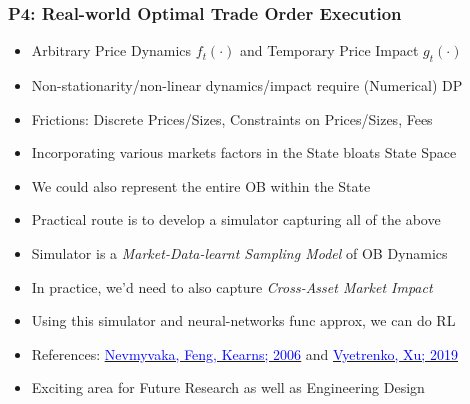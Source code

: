 \documentclass[handout]{beamer}
\begin{document}
\begin{frame}
\frametitle{P4: Real-world Optimal Trade Order Execution}
\pause
\begin{itemize}[<+->]
\item Arbitrary Price Dynamics $f_t(\cdot)$ and Temporary Price Impact $g_t(\cdot)$
\item Non-stationarity/non-linear dynamics/impact require (Numerical) DP
\item Frictions: Discrete Prices/Sizes, Constraints on Prices/Sizes, Fees
\item Incorporating various markets factors in the State bloats State Space
\item We could also represent the entire OB within the State
\item Practical route is to develop a simulator capturing all of the above
\item Simulator is a {\em Market-Data-learnt Sampling Model} of OB Dynamics 
\item In practice, we'd need to also capture {\em Cross-Asset Market Impact}
\item Using this simulator and neural-networks func approx, we can do RL
\item References: \href{https://www.cis.upenn.edu/~mkearns/papers/rlexec.pdf}{\underline{\textcolor{blue}{Nevmyvaka, Feng, Kearns; 2006}}} and \href{https://arxiv.org/pdf/1906.02312.pdf}{\underline{\textcolor{blue}{Vyetrenko, Xu; 2019}}}
\item Exciting area for Future Research as well as Engineering Design
\end{itemize}
\end{frame}
\end{document}
